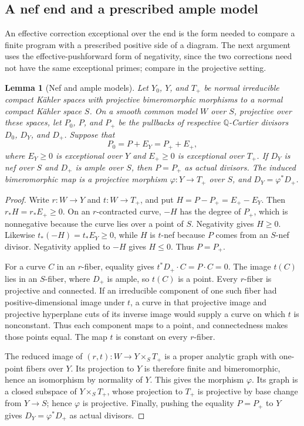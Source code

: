 \documentclass[11pt]{amsart}
\newtheorem{lemma}[theorem]{Lemma}
\theoremstyle{definition}
\theoremstyle{remark}
\numberwithin{equation}{section}
\newcommand{\Q}{\mathbb{Q}}
\begin{document}
\subsection{A nef end and a prescribed ample model}

An effective correction exceptional over the end is the form needed to
compare a finite program with a prescribed positive side of a diagram.
The next argument uses the effective-pushforward form of negativity,
since the two corrections need not have the same exceptional primes;
compare \cite[Lemma~2.5]{ProjectiveLCFourfolds} in the projective setting.

\begin{lemma}[Nef and ample models]\label{lem:nef-ample}
Let $Y_0$, $Y$, and $T_+$ be normal irreducible compact K\"ahler spaces
with projective bimeromorphic morphisms to a normal compact K\"ahler
space $S$.  On a smooth common model $W$ over $S$, projective over these
spaces, let $P_0$, $P$, and $P_+$ be the pullbacks of respective
$\Q$-Cartier divisors $D_0$, $D_Y$, and $D_+$.  Suppose that
\[
 P_0=P+E_Y=P_++E_+,
\]
where $E_Y\geq0$ is exceptional over $Y$ and $E_+\geq0$ is exceptional
over $T_+$.  If $D_Y$ is nef over $S$ and $D_+$ is ample over $S$,
then $P=P_+$ as actual divisors.  The induced bimeromorphic map is a
projective morphism $\varphi:Y\to T_+$ over $S$, and
$D_Y=\varphi^*D_+$.
\end{lemma}

\begin{proof}
Write $r:W\to Y$ and $t:W\to T_+$, and put
$H=P-P_+=E_+-E_Y$.  Then $r_*H=r_*E_+\geq0$.  On an $r$-contracted
curve, $-H$ has the degree of $P_+$, which is nonnegative because
the curve lies over a point of $S$.  Negativity gives $H\geq0$.
Likewise $t_*(-H)=t_*E_Y\geq0$, while $H$ is $t$-nef because $P$ comes
from an $S$-nef divisor.  Negativity applied to $-H$ gives $H\leq0$.
Thus $P=P_+$.

For a curve $C$ in an $r$-fiber, equality gives
$t^*D_+\cdot C=P\cdot C=0$.  The image $t(C)$ lies in an $S$-fiber,
where $D_+$ is ample, so $t(C)$ is a point.  Every $r$-fiber is
projective and connected.  If an irreducible component of one such
fiber had positive-dimensional image under $t$, a curve in that
projective image and projective hyperplane cuts of its inverse image
would supply a curve on which $t$ is nonconstant.  Thus each component
maps to a point, and connectedness makes those points equal.  The map
$t$ is constant on every $r$-fiber.

The reduced image of $(r,t):W\to Y\times_ST_+$ is a proper analytic
graph with one-point fibers over $Y$.  Its projection to $Y$ is
therefore finite and bimeromorphic, hence an isomorphism by normality
of $Y$.  This gives the morphism $\varphi$.  Its graph is a closed
subspace of $Y\times_ST_+$, whose projection to $T_+$ is projective
by base change from $Y\to S$; hence $\varphi$ is projective.  Finally,
pushing the equality $P=P_+$ to $Y$ gives
$D_Y=\varphi^*D_+$ as actual divisors.
\end{proof}
\end{document}
